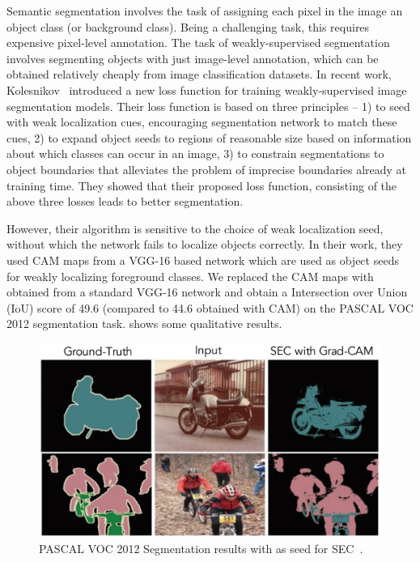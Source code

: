Semantic segmentation involves the task of assigning each pixel in the image an object class (or background class).
Being a challenging task, this requires expensive pixel-level annotation. 
The task of weakly-supervised segmentation involves segmenting objects with just image-level annotation, which can be obtained relatively cheaply from image classification datasets.
In recent work, Kolesnikov~\etal \cite{seed_eccv16} introduced a new loss function for training weakly-supervised image segmentation models.
Their loss function is based on three principles --
1) to seed with weak localization cues, encouraging segmentation network to match these cues,
2) to expand object seeds to regions of reasonable size based on information about which classes can occur in an image,
3) to constrain segmentations to object boundaries that alleviates the problem of imprecise boundaries already at training time.
They showed that their proposed loss function, consisting of the above three losses leads to better segmentation. 

However, their algorithm is sensitive to the choice of weak localization seed,
without which the network fails to localize objects correctly.
In their work, they used CAM maps from a VGG-16 based network which are used as object seeds for weakly localizing foreground classes.
We replaced the CAM maps with \gcam{} obtained from a standard VGG-16 network and obtain a Intersection over Union (IoU) score of 49.6 (compared to 44.6 obtained with CAM) on the PASCAL VOC 2012 segmentation task.  shows some qualitative results.

\begin{figure}[htp]
\vspace{-17pt}
 \centering
 \includegraphics[width=1\linewidth]{figures/segmentation_qualitative.jpg}
 \caption{PASCAL VOC 2012 Segmentation results with \gcam{} as seed for SEC~\cite{seed_eccv16}.}
 \label{fig:segmentation_qual}
 \vspace{-10pt}
\end{figure}




